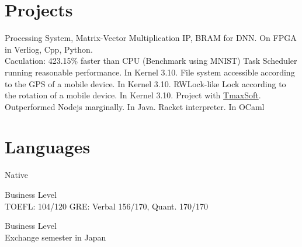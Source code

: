 \documentclass[10pt]{article} %
\begin{document}

\section{Projects}

{
Processing System, Matrix-Vector Multiplication IP, BRAM for DNN. On FPGA in Verliog, Cpp, Python.\\
Caculation: 423.15\% faster than CPU (Benchmark using MNIST)
}
{
Task Scheduler running reasonable performance. In Kernel 3.10.
}
{
File system accessible according to the GPS of a mobile device. In Kernel 3.10.
}
{
RWLock-like Lock according to the rotation of a mobile device. In Kernel 3.10.
}
{
Project with \href{https://kr.tmaxsoft.com/main.do}{TmaxSoft}. Outperformed Nodejs marginally. In Java.
}
{
Racket interpreter. In OCaml
}


\section{Languages}

{
Native
}

{
Business Level\\
TOEFL: 104/120 \hspace{10mm} GRE: Verbal 156/170, Quant. 170/170
}

{
Business Level\\
Exchange semester in Japan
}
\end{document}
